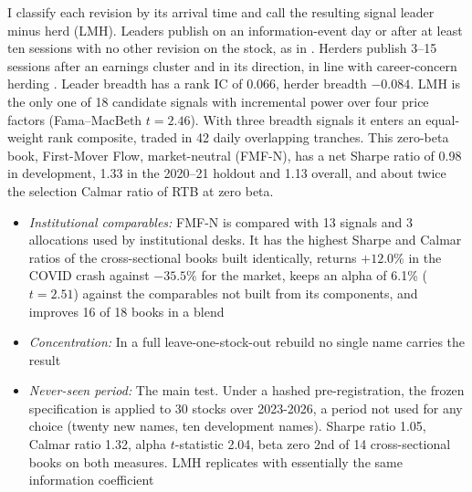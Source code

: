  I classify each revision by its arrival time and call the resulting signal leader minus herd (LMH). Leaders publish on an information-event day or after at least ten sessions with no other revision on the stock, as in \citet{cooper2001}. Herders publish 3--15 sessions after an earnings cluster and in its direction, in line with career-concern herding \citep{welch2000,hong2000,clement2005}. Leader breadth has a rank IC of 0.066, herder breadth $-0.084$. LMH is the only one of 18 candidate signals with incremental power over four price factors (Fama--MacBeth $t = 2.46$). With three breadth signals it enters an equal-weight rank composite, traded in 42 daily overlapping tranches. This zero-beta book, First-Mover Flow, market-neutral (FMF-N), has a net Sharpe ratio of 0.98 in development, 1.33 in the 2020--21 holdout and 1.13 overall, and about twice the selection Calmar ratio of RTB at zero beta.

\begin{itemize}
  \item \emph{Institutional comparables:} FMF-N is compared with 13 signals and 3 allocations used by institutional desks. It has the highest Sharpe and Calmar ratios of the cross-sectional books built identically, returns $+12.0\%$ in the COVID crash against $-35.5\%$ for the market, keeps an alpha of 6.1\% ($t = 2.51$) against the comparables not built from its components, and improves 16 of 18 books in a blend
  \item \emph{Concentration:} In a full leave-one-stock-out rebuild no single name carries the result
  \item \emph{Never-seen period:} The main test. Under a hashed pre-registration, the frozen specification is applied to 30 stocks over 2023-2026, a period not used for any choice (twenty new names, ten development names). Sharpe ratio 1.05, Calmar ratio 1.32, alpha $t$-statistic 2.04, beta zero 2nd of 14 cross-sectional books on both measures. LMH replicates with essentially the same information coefficient
\end{itemize}

